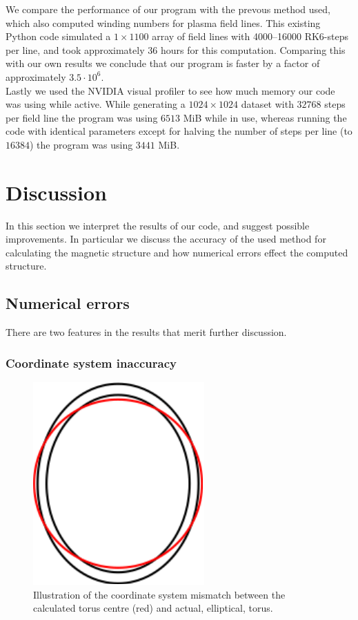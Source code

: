 \documentclass[a4paper]{article}
\begin{document}

We compare the performance of our program with the prevous method used, which also computed winding numbers for plasma field lines.
This existing Python code simulated a $1\times 1100$ array of field lines with 4000--16000 RK6-steps per line, and took approximately $36$ hours for this computation. 
Comparing this with our own results we conclude that our program is faster by a factor of approximately $3.5\cdot 10^6$.\\

Lastly we used the NVIDIA visual profiler to see how much memory our code was using while active. 
While generating a $1024\times 1024$ dataset with $32768$ steps per field line the program was using $6513$ MiB while in use, whereas running the code with identical parameters except for halving the number of steps per line (to $16384$) the program was using $3441$ MiB.


\section{Discussion}
In this section we interpret the results of our code, and suggest possible improvements. 
In particular we discuss the accuracy of the used method for calculating the magnetic structure and how numerical errors effect the computed structure.

\subsection{Numerical errors}\label{section:numerrors}
There are two features in the results that merit further discussion. 

\subsubsection{Coordinate system inaccuracy}

\begin{figure}[!ht]
	\centering
	\includegraphics{Figures/TorusMismatch.pdf}
	\caption{ Illustration of the coordinate system mismatch between the calculated torus centre (red) and actual, elliptical, torus.}\label{fig:mismatch}
\end{figure}
\end{document}
